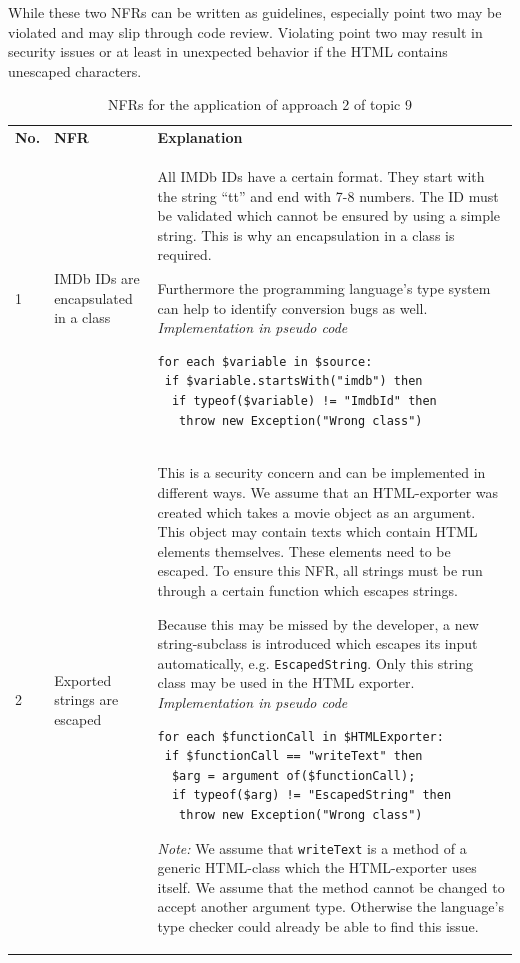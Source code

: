 While these two NFRs can be written as guidelines, especially point two may be violated and may slip through code review. Violating point two may result in security issues or at least in unexpected behavior if the HTML contains unescaped characters.
\newpage
\begin{longtable}{p{}|p{}|p{}}
	\caption{NFRs for the application of approach 2 of topic 9}
	\label{tbl:topic_9_approach_2_nfr}
	\setlength{\tabcolsep}{1em} \\
	\hline    %
	\textbf{No.} & \textbf{NFR} & \textbf{Explanation} \\
	\hline
	1 & IMDb IDs are encapsulated in a class &
	All IMDb IDs have a certain format. They start with the string \enquote{tt} and end with 7-8 numbers. The ID must be validated which cannot be ensured by using a simple string. This is why an encapsulation in a class is required.
	
	Furthermore the programming language's type system can help to identify conversion bugs as well.
	\newline \newline \textit{Implementation in pseudo code}
	\begin{lstlisting}
for each $variable in $source:
 if $variable.startsWith("imdb") then
  if typeof($variable) != "ImdbId" then
   throw new Exception("Wrong class")
	\end{lstlisting}\\
	\hline
	
	2 & Exported strings are escaped &
	This is a security concern and can be implemented in different ways. We assume that an HTML-exporter was created which takes a movie object as an argument.
	This object may contain texts which contain HTML elements themselves.
	These elements need to be escaped. To ensure this NFR, all strings must be run through a certain function which escapes strings.
	
	Because this may be missed by the developer, a new string-subclass is introduced which escapes its input automatically, e.g. \texttt{EscapedString}.
	Only this string class may be used in the HTML exporter.
	\newline \newline \textit{Implementation in pseudo code}
	
	\begin{lstlisting}
for each $functionCall in $HTMLExporter:
 if $functionCall == "writeText" then
  $arg = argument of($functionCall);
  if typeof($arg) != "EscapedString" then
   throw new Exception("Wrong class")
	\end{lstlisting}

\textit{Note:} We assume that \texttt{writeText} is a method of a generic HTML-class which the HTML-exporter uses itself. We assume that the method cannot be changed to accept another argument type. Otherwise the language's type checker could already be able to find this issue.\\

\hline
\end{longtable}


